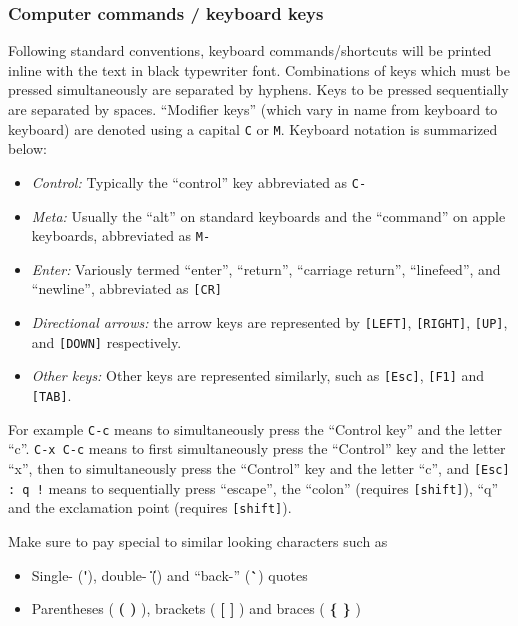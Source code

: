 \documentclass[10pt,letterpaper]{article}
\begin{document}
\subsubsection{Computer commands / keyboard keys}

Following standard conventions, keyboard commands/shortcuts will be printed inline with the text in black typewriter font.  Combinations of keys which must be pressed simultaneously are separated by hyphens.  Keys to be pressed sequentially are separated by spaces.  ``Modifier keys'' (which vary in name from keyboard to keyboard) are denoted using a capital \texttt{C} or \texttt{M}.  Keyboard notation is summarized below:


\begin{itemize}
  \item \emph{Control:} Typically the ``control'' key abbreviated as \texttt{C-}
  \item \emph{Meta:} Usually the ``alt'' on standard keyboards and the ``command'' on apple keyboards, abbreviated as \texttt{M-}
  \item \emph{Enter:} Variously termed ``enter'', ``return'', ``carriage return'', ``linefeed'', and ``newline'', abbreviated as \texttt{[CR]}
  \item \emph{Directional arrows:} the arrow keys are represented by \texttt{[LEFT]}, \texttt{[RIGHT]}, \texttt{[UP]}, and \texttt{[DOWN]} respectively.
  \item \emph{Other keys:} Other keys are represented similarly, such as \texttt{[Esc]}, \texttt{[F1]} and \texttt{[TAB]}.
\end{itemize}


For example \texttt{C-c} means to simultaneously press the ``Control key'' and the letter ``c''.  \texttt{C-x C-c} means to first simultaneously press the ``Control'' key and the letter ``x'', then to simultaneously press the ``Control'' key and the letter ``c'', and \texttt{[Esc] : q !} means to sequentially press ``escape'', the ``colon'' (requires \texttt{[shift]}), ``q'' and the exclamation point (requires \texttt{[shift]}).


Make sure to pay special to similar looking characters such as
\begin{itemize}
  \item Single- (\textcolor{simpleRed}{\textbf{\'}}), double- (\textcolor{simpleRed}{\textbf{\"}}) and ``back-'' (\textcolor{simpleRed}{\textbf{\`}}) quotes
  \item Parentheses (\textcolor{simpleRed}{\textbf{ ( ) }}), brackets (\textcolor{simpleRed}{\textbf{ [ ] }}) and braces (\textcolor{simpleRed}{\textbf{ \{ \} }})
\end{itemize}
\end{document}
